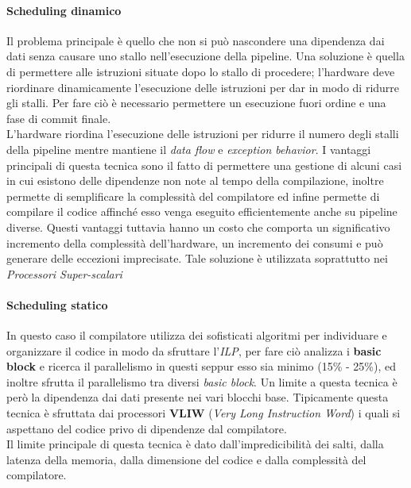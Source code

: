 \paragraph{Scheduling dinamico}
Il problema principale è quello che non si può nascondere una dipendenza dai dati senza causare uno stallo nell'esecuzione della pipeline. Una soluzione è quella di permettere alle istruzioni situate dopo lo stallo di procedere; l'hardware deve riordinare dinamicamente l'esecuzione delle istruzioni per dar in modo di ridurre gli stalli. Per fare ciò è necessario permettere un esecuzione fuori ordine e una fase di commit finale.\\
L'hardware riordina l'esecuzione delle istruzioni per ridurre il numero degli stalli della pipeline mentre mantiene il \emph{data flow} e \emph{exception behavior}. I vantaggi principali di questa tecnica sono il fatto di permettere una gestione di alcuni casi in cui esistono delle dipendenze non note al tempo della compilazione, inoltre permette di semplificare la complessità del compilatore ed infine permette di compilare il codice affinché esso venga eseguito efficientemente anche su pipeline diverse. Questi vantaggi tuttavia hanno un costo che comporta un significativo incremento della complessità dell'hardware, un incremento dei consumi e può generare delle eccezioni imprecisate.
Tale soluzione è utilizzata soprattutto nei \emph{Processori Super-scalari}
\paragraph{Scheduling statico}
In questo caso il compilatore utilizza dei sofisticati algoritmi per individuare e organizzare il codice in modo da sfruttare l'\emph{ILP}, per fare ciò analizza i \textbf{basic block} e ricerca il parallelismo in questi seppur esso sia minimo (15\% - 25\%), ed inoltre sfrutta il parallelismo tra diversi \emph{basic block}. Un limite a questa tecnica è però la dipendenza dai dati presente nei vari blocchi base. Tipicamente questa tecnica è sfruttata dai processori \textbf{VLIW} (\emph{Very Long Instruction Word}) i quali si aspettano del codice privo di dipendenze dal compilatore.\\
Il limite principale di questa tecnica è dato dall'impredicibilità dei salti, dalla latenza della memoria, dalla dimensione del codice e dalla complessità del compilatore.
